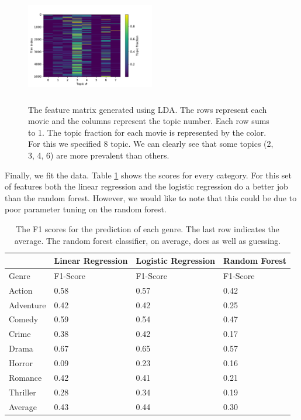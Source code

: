 \documentclass[11pt]{article}
\begin{document}
\begin{figure}[ht]
	\centering
		\includegraphics[width=0.5\textwidth,height=5cm]{lda_features.pdf}
	\caption{The feature matrix generated using LDA. The rows represent each movie and the columns represent the topic number. Each row sums to 1. The topic fraction for each movie is represented by the color. For this we specified 8 topic. We can clearly see that some topics (2, 3, 4, 6) are more prevalent than others.}
	\label{fig:lda}
\end{figure}

Finally, we fit the data. Table \ref{tab:lda_scores} shows the scores for every category. For this set of features both the linear regression and the logistic regression do a better job than the random forest. However, we would like to note that this could be due to poor parameter tuning on the random forest.

\begin{table}[h]
	\label{tab:lda_scores}
\begin{center}
	\begin{tabular}{| l | l | l | l |}
		\hline
		           & Linear Regression & Logistic Regression & Random Forest \\
		\hline
		Genre      & F1-Score          & F1-Score            & F1-Score       \\
	  	\hline			
	  	Action     & 0.58              & 0.57                & 0.42 \\
	  	Adventure  & 0.42              & 0.42                & 0.25 \\ 
	  	Comedy     & 0.59              & 0.54                & 0.47 \\
	  	Crime      & 0.38              & 0.42                & 0.17 \\
	  	Drama      & 0.67              & 0.65                & 0.57 \\
	  	Horror     & 0.09              & 0.23                & 0.16 \\
	  	Romance    & 0.42              & 0.41                & 0.21 \\
	  	Thriller   & 0.28              & 0.34                & 0.19 \\
	  	\hline
	  	Average    & 0.43              & 0.44                & 0.30 \\
	  \hline  
	\end{tabular}
\end{center}
	\caption{The F1 scores for the prediction of each genre. The last row indicates the average. The random forest classifier, on average, does as well as guessing.}
\end{table}
\end{document}
